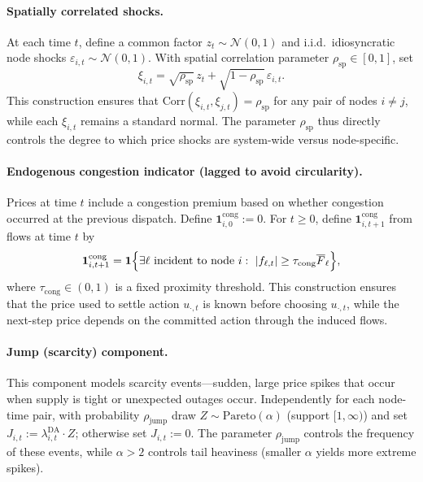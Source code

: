 \documentclass[11pt]{article}
\begin{document}
\paragraph{Spatially correlated shocks.}
At each time $t$, define a common factor $z_t\sim\mathcal{N}(0,1)$ and i.i.d.\ idiosyncratic node shocks $\varepsilon_{i,t}\sim\mathcal{N}(0,1)$. With spatial correlation parameter $\rho_{\mathrm{sp}}\in[0,1]$, set
\[
\xi_{i,t}=\sqrt{\rho_{\mathrm{sp}}}\,z_t+\sqrt{1-\rho_{\mathrm{sp}}}\,\varepsilon_{i,t}.
\]
This construction ensures that $\mathrm{Corr}(\xi_{i,t},\xi_{j,t})=\rho_{\mathrm{sp}}$ for any pair of nodes $i\ne j$, while each $\xi_{i,t}$ remains a standard normal. The parameter $\rho_{\mathrm{sp}}$ thus directly controls the degree to which price shocks are system-wide versus node-specific.

\paragraph{Endogenous congestion indicator (lagged to avoid circularity).}
Prices at time $t$ include a congestion premium based on whether congestion occurred at the previous dispatch. Define $\mathbf{1}^{\mathrm{cong}}_{i,0}:=0$. For $t\ge 0$, define $\mathbf{1}^{\mathrm{cong}}_{i,t+1}$ from flows at time $t$ by
\[
\mathbf{1}^{\mathrm{cong}}_{i,t+1}
=
\mathbf{1}\Bigl\{\exists \ell \text{ incident to node } i:\ |f_{\ell,t}|\ge \tau_{\mathrm{cong}}\overline{F}_\ell\Bigr\},
\]
where $\tau_{\mathrm{cong}}\in(0,1)$ is a fixed proximity threshold. This construction ensures that the price used to settle action $u_{\cdot,t}$ is known before choosing $u_{\cdot,t}$, while the next-step price depends on the committed action through the induced flows.

\paragraph{Jump (scarcity) component.}
This component models scarcity events---sudden, large price spikes that occur when supply is tight or unexpected outages occur. Independently for each node-time pair, with probability $\rho_{\mathrm{jump}}$ draw $Z\sim\mathrm{Pareto}(\alpha)$ (support $[1,\infty)$) and set $J_{i,t}:=\lambda^{\mathrm{DA}}_{i,t}\cdot Z$; otherwise set $J_{i,t}:=0$. The parameter $\rho_{\mathrm{jump}}$ controls the frequency of these events, while $\alpha>2$ controls tail heaviness (smaller $\alpha$ yields more extreme spikes).
\end{document}
